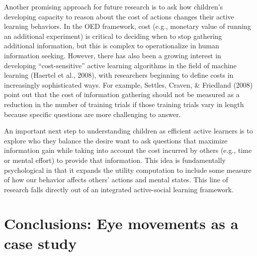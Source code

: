 \documentclass[oneside]{report}
\begin{document}
Another promising approach for future research is to ask how children's
developing capacity to reason about the cost of actions changes their
active learning behaviors. In the OED framework, cost (e.g., monetary
value of running an additional experiment) is critical to deciding when
to stop gathering additional information, but this is complex to
operationalize in human information seeking. However, there has also
been a growing interest in developing ``cost-sensitive'' active learning
algorithms in the field of machine learning (Haertel et al., 2008), with
researchers beginning to define costs in increasingly sophisticated
ways. For example, Settles, Craven, \& Friedland (2008) point out that
the cost of information gathering should not be measured as a reduction
in the number of training trials if those training trials vary in length
because specific questions are more challenging to answer.

An important next step to understanding children as efficient active
learners is to explore who they balance the desire want to ask questions
that maximize information gain while taking into account the cost
incurred by others (e.g., time or mental effort) to provide that
information. This idea is fundamentally psychological in that it expands
the utility computation to include some measure of how our behavior
affects others' actions and mental states. This line of research falls
directly out of an integrated active-social learning framework.

\section{Conclusions: Eye movements as a case
study}\label{conclusions-eye-movements-as-a-case-study}
\end{document}
